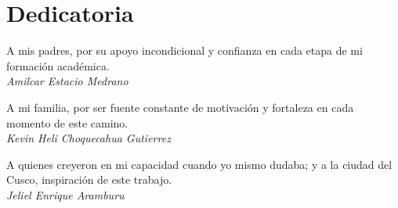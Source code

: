 \chapter*{Dedicatoria}

\begin{flushright}
A mis padres, por su apoyo incondicional y confianza en cada etapa de mi formación académica.\\[0.4cm]
\textit{Amilcar Estacio Medrano}
\end{flushright}

\vspace{2cm}

\begin{flushright}
A mi familia, por ser fuente constante de motivación y fortaleza en cada momento de este camino.\\[0.4cm]
\textit{Kevin Heli Choquecahua Gutierrez}
\end{flushright}

\vspace{2cm}

\begin{flushright}
A quienes creyeron en mi capacidad cuando yo mismo dudaba; y a la ciudad del Cusco, inspiración de este trabajo.\\[0.4cm]
\textit{Jeliel Enrique Aramburu}
\end{flushright}
